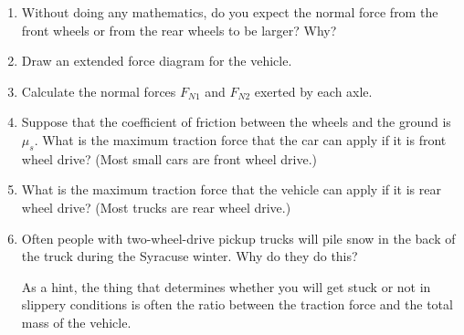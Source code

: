 \documentclass[12pt]{article}
\begin{document}
\begin{enumerate}

\item Without doing any mathematics, do you expect the normal force from the front wheels 
or from the rear wheels to be larger? Why?

\vspace{1in}

\item Draw an extended force diagram for the vehicle.

\newpage

\item Calculate the normal forces $F_{N1}$ and $F_{N2}$ exerted by each axle.

\vspace{3in}

\item Suppose that the coefficient of friction between the wheels and the ground is $\mu_s$. What is the maximum
traction force that the car can apply if it is front wheel drive? (Most small cars
are front wheel drive.)

\vspace{3.5in}

\item What is the maximum traction force that the vehicle can apply if it is rear wheel drive? (Most trucks are rear
wheel drive.)

\vspace{3.5in}

\item Often people with two-wheel-drive pickup trucks will pile snow in the back of the truck during the Syracuse winter.
Why do they do this?

As a hint, the thing that determines whether you will get stuck or not in slippery conditions is often the ratio between the traction force and the total mass of the vehicle.



\end{enumerate}
\newpage

\newpage


\Large
\centerline{}
\normalsize
\centerline{}
\end{document}
